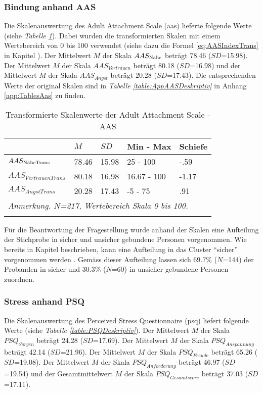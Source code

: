 \subsubsection{Bindung anhand AAS}
Die Skalenauswertung des Adult Attachment Scale (\acrshort{aas}) lieferte folgende Werte (siehe \textit{Tabelle \ref{table:AASDeskriptivTrans}}). Dabei wurden die transformierten Skalen mit einem Wertebereich von 0 bis 100 verwendet (siehe dazu die Formel \ref{eq:AASIndexTrans} in Kapitel ). Der Mittelwert $M$ der Skala $AAS_{\textnormal{Nähe}}$ beträgt 78.46 ($SD$=15.98). Der Mittelwert $M$ der Skala $AAS_{Vertrauen}$ beträgt 80.18 ($SD$=16.98) und der Mittelwert  $M$ der Skala $AAS_{Angst}$ beträgt 20.28 ($SD$=17.43). Die entsprechenden Werte der original Skalen sind in \textit{Tabelle \ref{table:AppAASDeskriptiv}} in Anhang \ref{app:TablesAas} zu finden.

\begin{table}%
\begin{tabular}{m{7em} m{3em}  m{3em}  m{5em} m{3em}} 
  \hline
  & $M$ & $SD$ & Min - Max & Schiefe\\
  \hline
  $AAS_{\textit{\textnormal{NäheTrans}}}$ & 78.46 & 15.98 & 25 - 100 & -.59\\
  $AAS_{VertrauenTrans}$ & 80.18 & 16.98 & 16.67 - 100 & -1.17\\
  $AAS_{AngstTrans}$ & 20.28 & 17.43 & -5 - 75 & .91 \\
  \hline
  \multicolumn{5}{l}{\textit{Anmerkung. $N$=217, Wertebereich Skala 0 bis 100.}}\\
  &&&&\\
\end{tabular}
\caption{Transformierte Skalenwerte der Adult Attachment Scale - AAS}
\label{table:AASDeskriptivTrans}
\end{table}

Für die Beantwortung der Fragestellung wurde anhand der Skalen eine Aufteilung der Stichprobe in sicher und unsicher gebundene Personen vorgenommen. Wie bereits in Kapitel  beschrieben, kann eine Aufteilung in das Cluster \enquote{sicher} vorgenommen werden \cite{Schuetzmann2004}. Gemäss dieser Aufteilung lassen sich 69.7\% ($N$=144) der Probanden in sicher und 30.3\% ($N$=60) in unsicher gebundene Personen zuordnen. 

\subsubsection{Stress anhand PSQ}
Die Skalenauswertung des Perceived Stress Questionnaire (\acrshort{psq}) liefert folgende Werte (siehe \textit{Tabelle \ref{table:PSQDeskriptiv}}). Der Mittelwert $M$ der Skala $PSQ_{Sorgen}$ beträgt 24.28 ($SD$=17.69). Der Mittelwert $M$ der Skala $PSQ_{Anspannung}$ beträgt 42.14 ($SD$=21.96). Der Mittelwert $M$ der Skala $PSQ_{Freude}$ beträgt 65.26 ($SD$=19.08). Der Mittelwert $M$ der Skala $PSQ_{Anforderung}$ beträgt 46.97 ($SD$=19.54) und der Gesamtmittelwert $M$ der Skala $PSQ_{Gesamtscore}$ beträgt 37.03 ($SD$=17.11).

